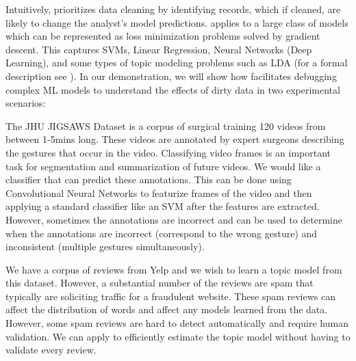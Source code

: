 Intuitively, \sys prioritizes data cleaning by identifying records, which if cleaned, are likely to change the analyst's model predictions.
\sys applies to a large class of models which can be represented as loss minimization problems solved by gradient descent.
This captures SVMs, Linear Regression, Neural Networks (Deep Learning), and some types of topic modeling problems such as LDA (for a formal description see \cite{activecleanarxiv}).
In our demonstration, we will show how \sys facilitates debugging complex ML models to understand the effects of dirty data in two experimental scenarios: 

\begin{example}\sloppy
The JHU JIGSAWS Dataset is a corpus of surgical training 120 videos from between 1-5mins long.
These videos are annotated by expert surgeons describing the gestures that occur in the video. 
Classifying video frames is an important task for segmentation and summarization of future videos.
We would like a classifier that can predict these annotations.
This can be done using Convolutional Neural Networks to featurize frames of the video and then applying a standard classifier like an SVM after the features are extracted.
However, sometimes the annotations are incorrect and \sys can be used to determine when the annotations are incorrect (correspond to the wrong gesture) and inconsistent (multiple gestures simultaneously).
\end{example}

\begin{example}\sloppy
We have a corpus of reviews from Yelp and we wish to learn a topic model from this dataset.
However, a substantial number of the reviews are spam that typically are soliciting traffic for a fraudulent website.
These spam reviews can affect the distribution of words and affect any models learned from the data.
However, some spam reviews are hard to detect automatically and require human validation.
We can apply \sys to efficiently estimate the topic model without having to validate every review.
\end{example}
 


